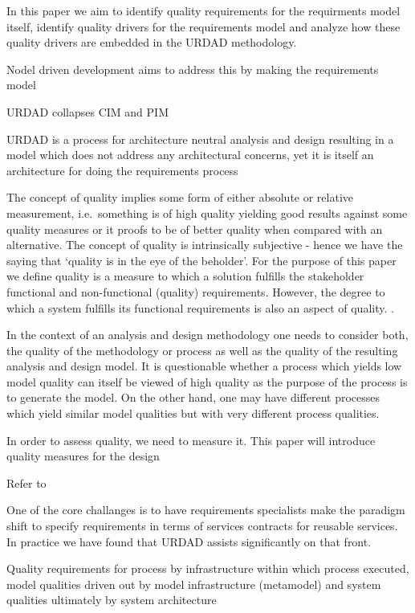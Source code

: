 In this paper we aim to identify quality requirements for the requirments model itself, identify quality drivers for the requirements model and analyze how these quality drivers are embedded in the URDAD methodology.

Nodel driven development aims to address this by making the requirements model

URDAD collapses CIM and PIM

URDAD is a process for architecture neutral analysis and design resulting in a model which does not address any architectural concerns, yet it is itself an architecture for doing the requirements process

The concept of quality implies some form of either absolute or relative measurement, i.e.\ something is of high quality yielding good results against some quality measures or it proofs to be of better quality when compared with an alternative. 
 The concept of quality is intrinsically subjective - hence we have the saying that `quality is in the eye of the beholder'. For the purpose of this paper we define quality is a measure to which a solution fulfills the stakeholder functional and non-functional (quality) requirements\cite{}. However, the degree to which a system fulfills its functional requirements is also an aspect of quality.  \cite{lange_managing_2005,lange_improving_2006}.


In the context of an analysis and design methodology one needs to consider both, the quality of the methodology or process as well as the quality of the resulting analysis and design model. It is questionable whether a process which yields low model quality can itself be viewed of high quality as the purpose of the process is to generate the model. On the other hand, one may have different processes which yield similar model qualities but with very different process qualities. 

In order to assess quality, we need to measure it. This paper will introduce quality measures for the design

Refer to \cite{wirfs-brock_object-oriented_1989}

One of the core challanges is to have requirements specialists make the paradigm shift to specify requirements in terms of services contracts for reusable services\cite{haines_impact_2007}. In practice we have found that URDAD assists significantly on that front.



Quality requirements for process  by infrastructure within which process executed, model qualities driven out by model infrastructure (metamodel) and system qualities ultimately by system architecture

